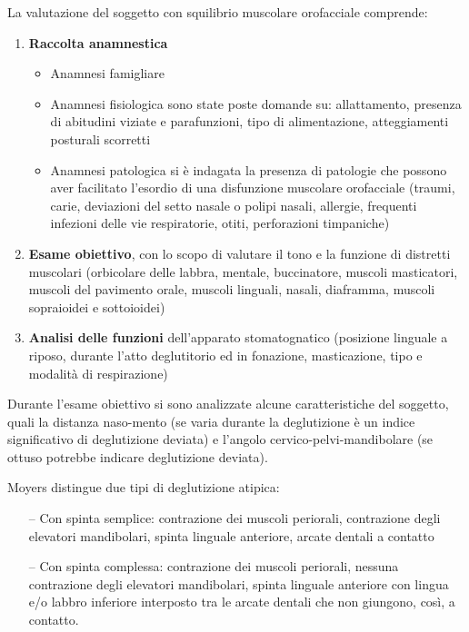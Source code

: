 La valutazione del soggetto con squilibrio muscolare orofacciale comprende: 

\begin{enumerate}
\item \textbf{Raccolta anamnestica}
\begin{itemize}
 \item Anamnesi famigliare
 \item Anamnesi fisiologica sono state poste domande su: allattamento, presenza di abitudini viziate e parafunzioni, tipo di alimentazione, atteggiamenti posturali scorretti
  \item Anamnesi patologica si è indagata la presenza di patologie che possono aver facilitato l'esordio di una disfunzione muscolare orofacciale (traumi, carie, deviazioni del setto nasale o polipi nasali, allergie, frequenti infezioni delle vie respiratorie, otiti, perforazioni timpaniche)
\end{itemize}
\item \textbf{Esame obiettivo}, con lo scopo di valutare il tono e la funzione di distretti muscolari (orbicolare delle labbra, mentale, buccinatore, muscoli masticatori, muscoli del pavimento orale, muscoli linguali, nasali, diaframma, muscoli sopraioidei e sottoioidei)
\item \textbf{Analisi delle funzioni} dell'apparato stomatognatico (posizione linguale a riposo, durante l'atto deglutitorio ed in fonazione, masticazione, tipo e modalità di respirazione)
\end{enumerate}

Durante l’esame obiettivo si sono analizzate alcune caratteristiche del soggetto, quali la distanza naso-mento (se varia durante la deglutizione è un indice significativo di deglutizione deviata) e l'angolo cervico-pelvi-mandibolare (se ottuso potrebbe indicare deglutizione deviata).

Moyers distingue due tipi di deglutizione atipica: 
\begin{itemize}
 \itemsep-0.5em
  \item[--]Con  spinta  semplice:  contrazione  dei  muscoli  periorali,  contrazione  degli elevatori mandibolari, spinta linguale anteriore, arcate dentali a contatto
  \item[--]Con  spinta  complessa:  contrazione  dei  muscoli  periorali,  nessuna contrazione degli  elevatori  mandibolari,  spinta  linguale  anteriore  con lingua  e/o  labbro inferiore interposto tra le arcate dentali che non giungono, così, a contatto.
\end{itemize}

